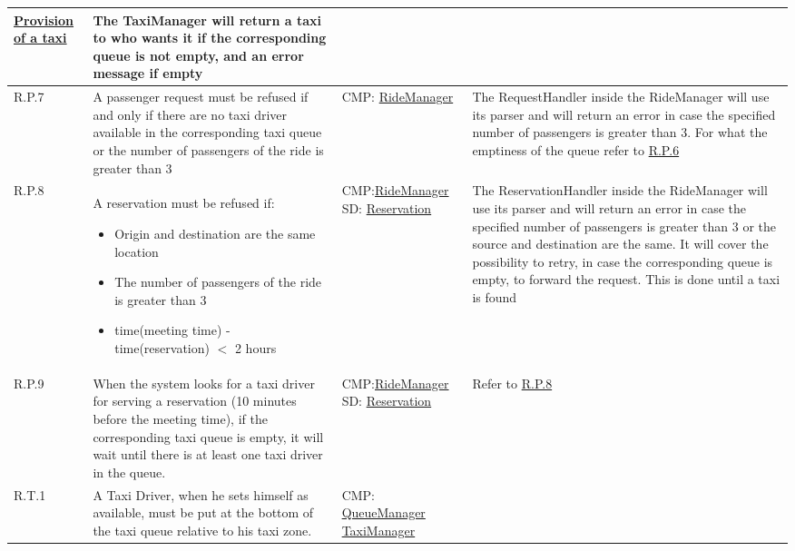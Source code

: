 \begin{center}
\begin{longtable}{|p{}|p{}|>{\raggedright\arraybackslash}p{}|>{\raggedright\arraybackslash}p{}|}
\hyperref[seq:provisionOfATaxi]{Provision of a taxi}
 & The TaxiManager will return a taxi to who wants it if the corresponding queue is not empty, and an error message if empty \\ \hline
R.P.7 & A passenger request must be refused if and only if there are no taxi driver available in the corresponding taxi queue or the number of passengers of the ride is greater than 3 & CMP: \linebreak \hyperref[comp:rideManager]{RideManager} & The  RequestHandler inside the RideManager will use its parser and will return an error in case the specified number of passengers is greater than 3. For what the emptiness of the queue refer to \hyperref[R.P.6]{R.P.6} \\ \hline
R.P.8\label{R.P.8} & A reservation must be refused if:
\begin{itemize}
	\item Origin and destination are the same location
	\item The number of passengers of the ride is greater than 3
	\item time(meeting time) - time(reservation) $<$ 2 hours
\end{itemize} & CMP:\linebreak \hyperref[comp:rideManager]{RideManager} \linebreak SD: \linebreak \hyperref[seq:passengerMakesReservation]{Reservation} & The  ReservationHandler inside the RideManager will use its parser and will return an error in case the specified number of passengers is greater than 3 or the source and destination are the same. It will cover the possibility to retry, in case the corresponding queue is empty, to forward the request. This is done until a taxi is found\\ \hline
R.P.9 & When the system looks for a taxi driver for serving a reservation (10 minutes before the meeting time), if the corresponding taxi queue is empty, it will wait until there is at least one taxi driver in the queue. & CMP:\linebreak \hyperref[comp:rideManager]{RideManager} \linebreak SD: \linebreak \hyperref[seq:passengerMakesReservation]{Reservation} & Refer to \hyperref[R.P.8]{R.P.8}\\ \hhline{|=|=|=|=|}
R.T.1 & A Taxi Driver, when he sets himself as available, must be put at the bottom of the taxi queue relative to his taxi zone. & CMP: \linebreak \hyperref[comp:queueManager]{QueueManager} \linebreak \hyperref[comp:taxiManager]{TaxiManager} \linebreak

\end{longtable}
\end{center}
